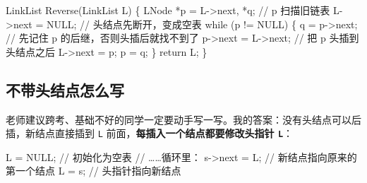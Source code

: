 \documentclass[10.5pt,a4paper,oneside]{article}
\newenvironment{Shaded}{}{}
\newcommand{\CommentTok}[1]{\textcolor[rgb]{0.18,0.55,0.23}{#1}}
\newcommand{\ControlFlowTok}[1]{\textcolor[rgb]{0.12,0.31,0.71}{#1}}
\newcommand{\NormalTok}[1]{#1}
\newcommand{\OperatorTok}[1]{\textcolor[rgb]{0.20,0.20,0.20}{#1}}
\begin{document}
\begin{Shaded}
\begin{Highlighting}[]
\NormalTok{LinkList Reverse}\OperatorTok{(}\NormalTok{LinkList L}\OperatorTok{)} \OperatorTok{\{}
\NormalTok{    LNode }\OperatorTok{*}\NormalTok{p }\OperatorTok{=}\NormalTok{ L}\OperatorTok{{-}\textgreater{}}\NormalTok{next}\OperatorTok{,} \OperatorTok{*}\NormalTok{q}\OperatorTok{;}   \CommentTok{// p 扫描旧链表}
\NormalTok{    L}\OperatorTok{{-}\textgreater{}}\NormalTok{next }\OperatorTok{=}\NormalTok{ NULL}\OperatorTok{;}           \CommentTok{// 头结点先断开，变成空表}
    \ControlFlowTok{while} \OperatorTok{(}\NormalTok{p }\OperatorTok{!=}\NormalTok{ NULL}\OperatorTok{)} \OperatorTok{\{}
\NormalTok{        q }\OperatorTok{=}\NormalTok{ p}\OperatorTok{{-}\textgreater{}}\NormalTok{next}\OperatorTok{;}          \CommentTok{// 先记住 p 的后继，否则头插后就找不到了}
\NormalTok{        p}\OperatorTok{{-}\textgreater{}}\NormalTok{next }\OperatorTok{=}\NormalTok{ L}\OperatorTok{{-}\textgreater{}}\NormalTok{next}\OperatorTok{;}    \CommentTok{// 把 p 头插到头结点之后}
\NormalTok{        L}\OperatorTok{{-}\textgreater{}}\NormalTok{next }\OperatorTok{=}\NormalTok{ p}\OperatorTok{;}
\NormalTok{        p }\OperatorTok{=}\NormalTok{ q}\OperatorTok{;}
    \OperatorTok{\}}
    \ControlFlowTok{return}\NormalTok{ L}\OperatorTok{;}
\OperatorTok{\}}
\end{Highlighting}
\end{Shaded}

\hypertarget{ux4e0dux5e26ux5934ux7ed3ux70b9ux600eux4e48ux5199-1}{%
\subsection{不带头结点怎么写}\label{ux4e0dux5e26ux5934ux7ed3ux70b9ux600eux4e48ux5199-1}}

老师建议跨考、基础不好的同学一定要动手写一写。我的答案：没有头结点可以后插，新结点直接插到
\texttt{L} 前面，\textbf{每插入一个结点都要修改头指针 \texttt{L}}：

\begin{Shaded}
\begin{Highlighting}[]
\NormalTok{    L }\OperatorTok{=}\NormalTok{ NULL}\OperatorTok{;}                 \CommentTok{// 初始化为空表}
    \CommentTok{// ……循环里：}
\NormalTok{    s}\OperatorTok{{-}\textgreater{}}\NormalTok{next }\OperatorTok{=}\NormalTok{ L}\OperatorTok{;}              \CommentTok{// 新结点指向原来的第一个结点}
\NormalTok{    L }\OperatorTok{=}\NormalTok{ s}\OperatorTok{;}                    \CommentTok{// 头指针指向新结点}
\end{Highlighting}
\end{Shaded}
\end{document}

